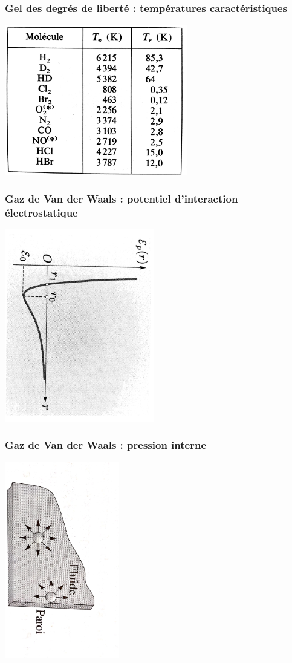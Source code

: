 \documentclass{beamer}
\begin{document}
\begin{frame}
\frametitle{Gel des degrés de liberté : températures caractéristiques}
\centerline{\includegraphics[width=8cm]{Tcaract}}
\end{frame}

\begin{frame}
\frametitle{Gaz de Van der Waals : potentiel d'interaction électrostatique}
\centerline {\includegraphics[width=6.5cm, angle=90]{VdW} }
\end{frame}

\begin{frame}
\frametitle{Gaz de Van der Waals : pression interne}
\centerline {\includegraphics[width=5cm, angle=90]{Pint} }
\end{frame}
\end{document}
